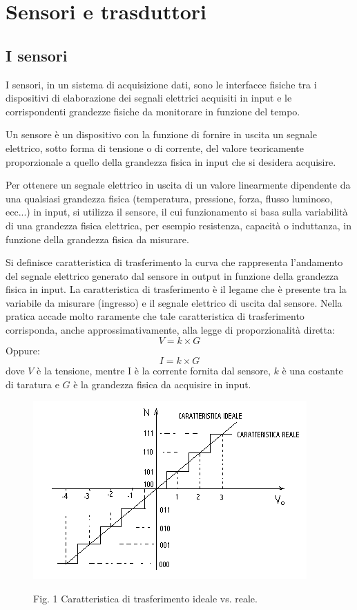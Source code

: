\documentclass[a4paper]{report} %
\begin{document}
\section{Sensori e trasduttori}
\subsection{I sensori}
I sensori, in un sistema di acquisizione dati, sono le interfacce fisiche tra i dispositivi di elaborazione dei segnali elettrici acquisiti in input e le corrispondenti grandezze fisiche da monitorare in funzione del tempo. 

Un sensore è un dispositivo con la funzione di fornire in uscita un segnale elettrico, sotto forma di tensione o di corrente, del valore teoricamente proporzionale a quello della grandezza fisica in input che si desidera acquisire. 

Per ottenere un segnale elettrico in uscita di un valore linearmente dipendente da una qualsiasi grandezza fisica (temperatura, pressione, forza, flusso luminoso, ecc...) in input, si utilizza il sensore, il cui funzionamento si basa sulla variabilità di una grandezza fisica elettrica, per esempio resistenza, capacità o induttanza, in funzione della grandezza fisica da misurare.

Si definisce caratteristica di trasferimento la curva che rappresenta l'andamento del segnale elettrico generato dal sensore in output in funzione della grandezza fisica in input.
La caratteristica di trasferimento è il legame che è presente tra la variabile da misurare (ingresso) e il segnale elettrico di uscita dal sensore. 
Nella pratica accade molto raramente che tale caratteristica di trasferimento corrisponda, anche approssimativamente, alla legge di proporzionalità diretta: 
\begin{equation}
V = k \times G
\end{equation}
Oppure:
\begin{equation}
I = k \times G
\end{equation}
dove $V$ è la tensione, mentre I è la corrente fornita dal sensore, $k$ è una costante di taratura e $G$ è la grandezza fisica da acquisire in input.

\begin{figure}
\centering
\includegraphics[scale=.8]{Immagini/CarTrasferimento.png}

Fig. 1 Caratteristica di trasferimento ideale vs. reale.
\end{figure}
\end{document}
